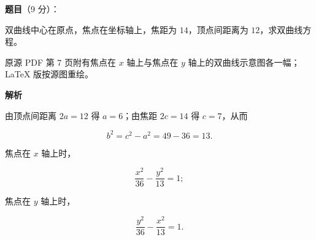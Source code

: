 \begin{answer}

\textbf{题目}（9 分）：

双曲线中心在原点，焦点在坐标轴上，焦距为 $14$，顶点间距离为 $12$，求双曲线方程。

\begin{gktip}
原源 PDF 第 7 页附有焦点在 $x$ 轴上与焦点在 $y$ 轴上的双曲线示意图各一幅；LaTeX 版按源图重绘。
\end{gktip}
\nopagebreak[4]
\begin{center}\end{center}
\nopagebreak[4]
\nopagebreak[4]
\begin{center}\end{center}
\nopagebreak[4]
\textbf{解析}

由顶点间距离 $2a=12$ 得 $a=6$；由焦距 $2c=14$ 得 $c=7$，从而

\nopagebreak[4]
\[
b^2=c^2-a^2=49-36=13.
\]

焦点在 $x$ 轴上时，

\nopagebreak[4]
\[
\frac{x^2}{36}-\frac{y^2}{13}=1;
\]

焦点在 $y$ 轴上时，

\nopagebreak[4]
\[
\frac{y^2}{36}-\frac{x^2}{13}=1.
\]
\nopagebreak[4]
\begin{center}\end{center}
\nopagebreak[4]
\nopagebreak[4]
\begin{center}\end{center}
\nopagebreak[4]

\end{answer}
